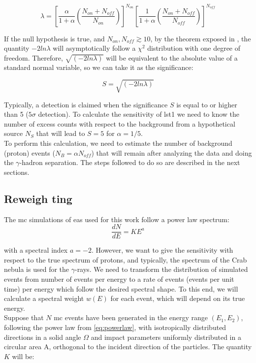 \documentclass[main.tex]{subfiles}
\begin{document}
\begin{equation}
  \lambda = \left[ \frac{\alpha}{1+\alpha}\left( \frac{N_{on}+N_{off}}{N_{on}}\right) \right]^{N_{on}} \left[ \frac{1}{1+\alpha}\left( \frac{N_{on}+N_{off}}{N_{off}}\right)\right]^{N_{off}}
\end{equation}

If the null hypothesis is true, and $N_{on}, N_{off} \gtrsim 10$, by the theorem exposed in \cite{1983LiMa}, the quantity $-2ln\lambda$ will asymptotically follow a $\chi^2$ distribution with one degree of freedom. Therefore, $\sqrt{(-2ln\lambda)}$ will be equivalent to the absolute value of a standard normal variable, so we can take it as the significance:

\begin{equation}
  S = \sqrt{(-2ln\lambda)}
\end{equation}

Typically, a detection is claimed when the significance $S$ is equal to or higher than 5 ($5\sigma$ detection). To calculate the sensitivity of \gls{lst}1 we need to know the number of excess counts with respect to the background from a hypothetical source $N_{S}$ that will lead to $S=5$ for $\alpha=1/5$. \\
To perform this calculation, we need to estimate the number of background (proton) events ($N_{B} = \alpha N_{off}$) that will remain after analyzing the data and doing the $\gamma$-hadron separation. The steps followed to do so are described in the next sections.

\subsection{Reweigh ting}

The \gls{mc} simulations of \gls{eas} used for this work follow a power law spectrum:
\begin{equation} \label{eq:powerlaw}
\frac{dN}{dE} = K E^{a}
\end{equation}

with a spectral index $a=-2$. However, we want to give the sensitivity with respect to the true spectrum of protons, and typically, the spectrum of the Crab nebula is used for the $\gamma$-rays. We need to transform the distribution of simulated events from number of events per energy to a rate of events (events per unit time) per energy which follow the desired spectral shape. To this end, we will calculate a spectral weight $w(E)$ for each event, which will depend on its true energy.\\
Suppose that $N$ \gls{mc} events have been generated in the energy range $(E_1,E_2)$, following the power law from \ref{eq:powerlaw}, with isotropically distributed directions in a solid angle $\Omega$ and impact parameters uniformly distributed in a circular area A, orthogonal to the incident direction of the particles.
The quantity $K$ will be:
\end{document}
